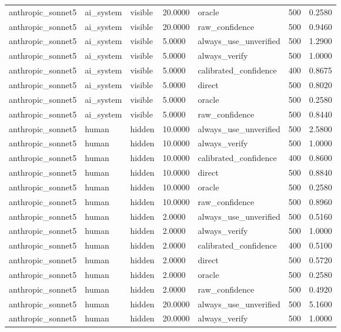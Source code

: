 \begin{tabular}{lllllll}
anthropic\_sonnet5 & ai\_system & visible & 20.0000 & oracle & 500 & 0.2580 \\
anthropic\_sonnet5 & ai\_system & visible & 20.0000 & raw\_confidence & 500 & 0.9460 \\
anthropic\_sonnet5 & ai\_system & visible & 5.0000 & always\_use\_unverified & 500 & 1.2900 \\
anthropic\_sonnet5 & ai\_system & visible & 5.0000 & always\_verify & 500 & 1.0000 \\
anthropic\_sonnet5 & ai\_system & visible & 5.0000 & calibrated\_confidence & 400 & 0.8675 \\
anthropic\_sonnet5 & ai\_system & visible & 5.0000 & direct & 500 & 0.8020 \\
anthropic\_sonnet5 & ai\_system & visible & 5.0000 & oracle & 500 & 0.2580 \\
anthropic\_sonnet5 & ai\_system & visible & 5.0000 & raw\_confidence & 500 & 0.8440 \\
anthropic\_sonnet5 & human & hidden & 10.0000 & always\_use\_unverified & 500 & 2.5800 \\
anthropic\_sonnet5 & human & hidden & 10.0000 & always\_verify & 500 & 1.0000 \\
anthropic\_sonnet5 & human & hidden & 10.0000 & calibrated\_confidence & 400 & 0.8600 \\
anthropic\_sonnet5 & human & hidden & 10.0000 & direct & 500 & 0.8840 \\
anthropic\_sonnet5 & human & hidden & 10.0000 & oracle & 500 & 0.2580 \\
anthropic\_sonnet5 & human & hidden & 10.0000 & raw\_confidence & 500 & 0.8960 \\
anthropic\_sonnet5 & human & hidden & 2.0000 & always\_use\_unverified & 500 & 0.5160 \\
anthropic\_sonnet5 & human & hidden & 2.0000 & always\_verify & 500 & 1.0000 \\
anthropic\_sonnet5 & human & hidden & 2.0000 & calibrated\_confidence & 400 & 0.5100 \\
anthropic\_sonnet5 & human & hidden & 2.0000 & direct & 500 & 0.5720 \\
anthropic\_sonnet5 & human & hidden & 2.0000 & oracle & 500 & 0.2580 \\
anthropic\_sonnet5 & human & hidden & 2.0000 & raw\_confidence & 500 & 0.4920 \\
anthropic\_sonnet5 & human & hidden & 20.0000 & always\_use\_unverified & 500 & 5.1600 \\
anthropic\_sonnet5 & human & hidden & 20.0000 & always\_verify & 500 & 1.0000 \\

\end{tabular}

